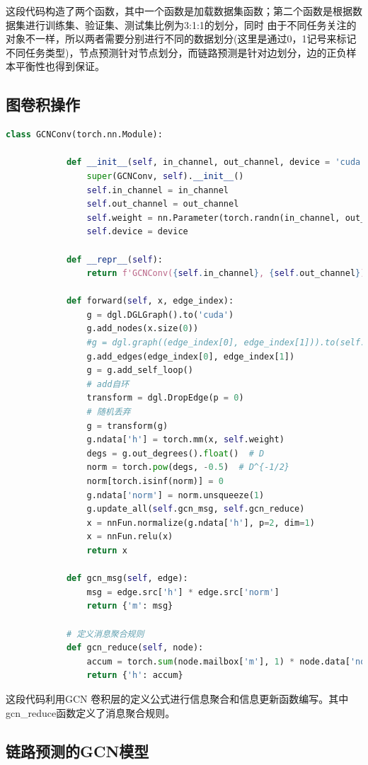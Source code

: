 \documentclass{article}
\begin{document}
	 这段代码构造了两个函数，其中一个函数是加载数据集函数；第二个函数是根据数据集进行训练集、验证集、测试集比例为3:1:1的划分，同时
	由于不同任务关注的对象不一样，所以两者需要分别进行不同的数据划分(这里是通过0，1记号来标记不同任务类型)，节点预测针对节点划分，而链路预测是针对边划分，边的正负样本平衡性也得到保证。
	
	\subsection{图卷积操作}
	
	\begin{lstlisting}[language=Python, caption=图卷积操作代码]
		class GCNConv(torch.nn.Module):
		
			def __init__(self, in_channel, out_channel, device = 'cuda'):
				super(GCNConv, self).__init__()
				self.in_channel = in_channel
				self.out_channel = out_channel
				self.weight = nn.Parameter(torch.randn(in_channel, out_channel))    
				self.device = device
			
			def __repr__(self):
				return f'GCNConv({self.in_channel}, {self.out_channel})'
			
			def forward(self, x, edge_index):
				g = dgl.DGLGraph().to('cuda')
				g.add_nodes(x.size(0))
				#g = dgl.graph((edge_index[0], edge_index[1])).to(self.device)
				g.add_edges(edge_index[0], edge_index[1])
				g = g.add_self_loop()
				# add自环
				transform = dgl.DropEdge(p = 0)
				# 随机丢弃
				g = transform(g)
				g.ndata['h'] = torch.mm(x, self.weight)
				degs = g.out_degrees().float()  # D
				norm = torch.pow(degs, -0.5)  # D^{-1/2}
				norm[torch.isinf(norm)] = 0
				g.ndata['norm'] = norm.unsqueeze(1)  
				g.update_all(self.gcn_msg, self.gcn_reduce)
				x = nnFun.normalize(g.ndata['h'], p=2, dim=1)
				x = nnFun.relu(x)
				return x
			
			def gcn_msg(self, edge):
				msg = edge.src['h'] * edge.src['norm']
				return {'m': msg}
			
			# 定义消息聚合规则
			def gcn_reduce(self, node):
				accum = torch.sum(node.mailbox['m'], 1) * node.data['norm']
				return {'h': accum}
	\end{lstlisting}
	这段代码利用GCN 卷积层的定义公式进行信息聚合和信息更新函数编写。其中gcn\_reduce函数定义了消息聚合规则。
	
\subsection{链路预测的GCN模型}
	
\end{document}

